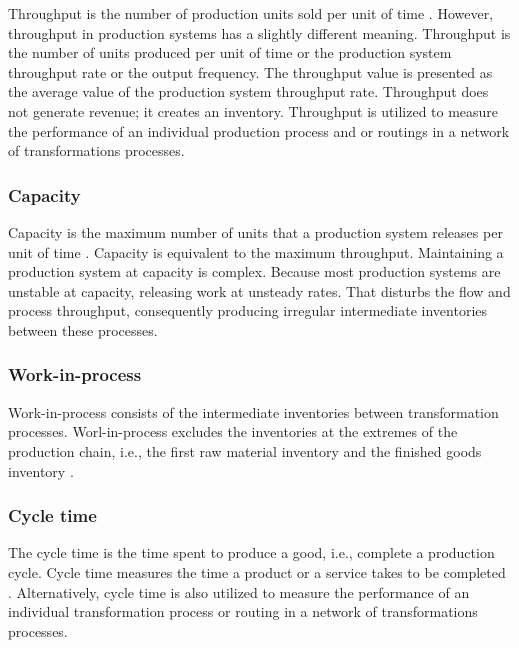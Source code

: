 \documentclass{article}
\begin{document}
Throughput is the number of production units sold per unit of time \citep{Hopp2001}.
However, throughput in production systems has a slightly different meaning.
Throughput is the number of units produced per unit of time or the production system throughput rate or the output frequency.
The throughput value is presented as the average value of the production system throughput rate.
Throughput does not generate revenue; it creates an inventory.
Throughput is utilized to measure the performance of an individual production process and or routings in a network of transformations processes.

\subsubsection{Capacity \label{capacity}}
\label{sec:orgf81889f}

Capacity is the maximum number of units that a production system releases per unit of time \citep{Hopp2001}.
Capacity is equivalent to the maximum throughput.
Maintaining a production system at capacity is complex.
Because most production systems are unstable at capacity, releasing work at unsteady rates.
That disturbs the flow and process throughput, consequently producing irregular intermediate inventories between these processes.

\subsubsection{Work-in-process \label{work-in-process}}
\label{sec:orgd1b3533}

Work-in-process consists of the intermediate inventories between transformation processes.
Worl-in-process excludes the inventories at the extremes of the production chain, i.e., the first raw material inventory and the finished goods inventory \citep{Hopp2001}.

\subsubsection{Cycle time \label{cycle_time}}
\label{sec:org9fd8ed7}

The cycle time is the time spent to produce a good, i.e., complete a production cycle.
Cycle time measures the time a product or a service takes to be completed \citep{Hopp2001}.
Alternatively, cycle time is also utilized to measure the performance of an individual transformation process or routing in a network of transformations processes.
\end{document}

